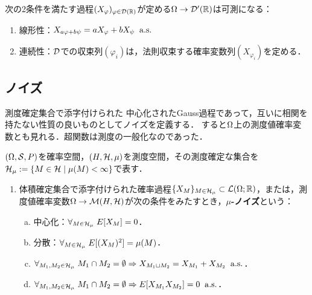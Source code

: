 \documentclass[uplatex,dvipdfmx]{jsreport}
\begin{document}
\begin{lemma}
    次の2条件を満たす過程$(X_\varphi)_{\varphi\in\mathcal{D}(\mathbb{R})}$が定める$\Omega\to\mathcal{D}'(\mathbb{R})$は可測になる：
    \begin{enumerate}
        \item 線形性：$X_{a\varphi+b\psi}=aX_\varphi+bX_\psi\;\;\mathrm{a.s.}$
        \item 連続性：$\mathcal{D}$での収束列$(\varphi_i)$は，法則収束する確率変数列$(X_{\varphi_i})$を定める．
    \end{enumerate}
\end{lemma}

\subsection{ノイズ}

\begin{tcolorbox}[colframe=ForestGreen, colback=ForestGreen!10!white,breakable,colbacktitle=ForestGreen!40!white,coltitle=black,fonttitle=\bfseries\sffamily,
title=]
    測度確定集合で添字付けられた
    中心化されたGauss過程であって，互いに相関を持たない性質の良いものとしてノイズを定義する．
    すると$\Omega$上の測度値確率変数とも見れる．超関数は測度の一般化なのであった．
\end{tcolorbox}

\begin{definition}
    $(\Omega,\mathcal{S},P)$を確率空間，$(H,\mathcal{H},\mu)$を測度空間，その測度確定な集合を$\mathcal{H}_\mu:=\{M\in\mathcal{H}\mid\mu(M)<\infty\}$で表す．
    \begin{enumerate}
        \item 体積確定集合で添字付けられた確率過程$\{X_M\}_{M\in\mathcal{H}_\mu}\subset\mathcal{L}(\Omega;\mathbb{R})$，または，測度値確率変数$\Omega\to\mathcal{M}(H,\mathcal{H})$が次の条件をみたすとき，\textbf{$\mu$-ノイズ}という：
        \begin{enumerate}[(a)]
            \item 中心化：$\forall_{M\in\mathcal{H}_\mu}\;E[X_M]=0$．
            \item 分散：$\forall_{M\in\mathcal{H}_\mu}\;E[(X_M)^2]=\mu(M)$．
            \item $\forall_{M_1,M_2\in\mathcal{H}_\mu}\;M_1\cap M_2=\emptyset\Rightarrow X_{M_1\sqcup M_2}=X_{M_1}+X_{M_2}\;\;\mathrm{a.s.}$．
            \item $\forall_{M_1,M_2\in\mathcal{H}_\mu}\;M_1\cap M_2=\emptyset\Rightarrow E[X_{M_1}X_{M_2}]=0\;\;\mathrm{a.s.}$．
        \end{enumerate}
    \end{enumerate}
\end{definition}
\end{document}
